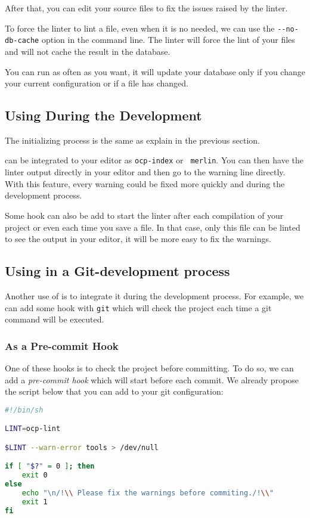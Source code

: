 After that, you can edit your source files to fix the issues raised by the
linter.

To force the linter to lint a file, even when it is no needed, we can use the
{\tt \--\--no-db-cache} option in the command line. The linter will force the
lint of your files and will not cache the result in the database.

You can run \ocplint{} as often as you want, it will update your
database only if you change your current configuration or if a file has changed.


\subsection{Using During the Development}

The initializing process is the same as explain in the previous section.

\ocplint{} can be integrated to your editor as {\tt ocp-index} or {\tt
  merlin}. You can then have the linter output directly in your editor and then
go to the warning line directly. With this feature, every warning could be fixed
more quickly and during the development process.

Some hook can also be add to start the linter after each compilation of your
project or even each time you save a file. In that case, only this file can be
linted to see the output in your editor, it will be more easy to fix the
warnings.

\subsection{Using in a Git-development process}
Another use of \ocplint{} is to integrate it during the development process. For
example, we can add some hook with {\tt git} which will check the project each
time a git command will be executed.

\subsubsection*{As a Pre-commit Hook}
One of these hooks is to check the project before committing. To do so, we can
add a {\em pre-commit hook} which will start \ocplint{} before each commit. We
already propose the script below that you can add to your git configuration:

\begin{lstlisting}[language=Bash]
#!/bin/sh

LINT=ocp-lint

$LINT --warn-error tools > /dev/null

if [ "$?" = 0 ]; then
    exit 0
else
    echo "\n/!\\ Please fix the warnings before commiting./!\\"
    exit 1
fi
\end{lstlisting}

